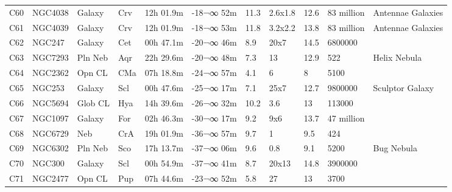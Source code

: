 \documentclass[10pt,twoside,a4paper,english]{report}
\begin{document}
\begin{longtable}{@{}lllllllllll@{}}
C60        & NGC4038     & Galaxy     & Crv       & 12h 01.9m & -18¬∞ 52m  & 11.3      & 2.6x1.8              & 12.6     & 83 million          & Antennae Galaxies               \\ 
C61        & NGC4039     & Galaxy     & Crv       & 12h 01.9m & -18¬∞ 53m  & 11.8      & 3.2x2.2              & 13.8     & 83 million          & Antennae Galaxies               \\ 
C62        & NGC247      & Galaxy     & Cet       & 00h 47.1m & -20¬∞ 46m  & 8.9       & 20x7                 & 14.5     & 6800000             &                                 \\ 
C63        & NGC7293     & Pln Neb    & Aqr       & 22h 29.6m & -20¬∞ 48m  & 7.3       & 13                   & 12.9     & 522                 & Helix Nebula                    \\ 
C64        & NGC2362     & Opn CL     & CMa       & 07h 18.8m & -24¬∞ 57m  & 4.1       & 6                    & 8        & 5100                &                                 \\ 
C65        & NGC253      & Galaxy     & Scl       & 00h 47.6m & -25¬∞ 17m  & 7.1       & 25x7                 & 12.7     & 9800000             & Sculptor Galaxy                 \\ 
C66        & NGC5694     & Glob CL    & Hya       & 14h 39.6m & -26¬∞ 32m  & 10.2      & 3.6                  & 13       & 113000              &                                 \\ 
C67        & NGC1097     & Galaxy     & For       & 02h 46.3m & -30¬∞ 17m  & 9.2       & 9x6                  & 13.7     & 47 million          &                                 \\ 
C68        & NGC6729     & Neb        & CrA       & 19h 01.9m & -36¬∞ 57m  & 9.7       & 1                    & 9.5      & 424                 &                                 \\ 
C69        & NGC6302     & Pln Neb    & Sco       & 17h 13.7m & -37¬∞ 06m  & 9.6       & 0.8                  & 9.1      & 5200                & Bug Nebula                      \\ 
C70        & NGC300      & Galaxy     & Scl       & 00h 54.9m & -37¬∞ 41m  & 8.7       & 20x13                & 14.8     & 3900000             &                                 \\ 
C71        & NGC2477     & Opn CL     & Pup       & 07h 44.6m & -23¬∞ 52m  & 5.8       & 27                   & 13       & 3700                &                                 \\ 

\end{longtable}
\end{document}
